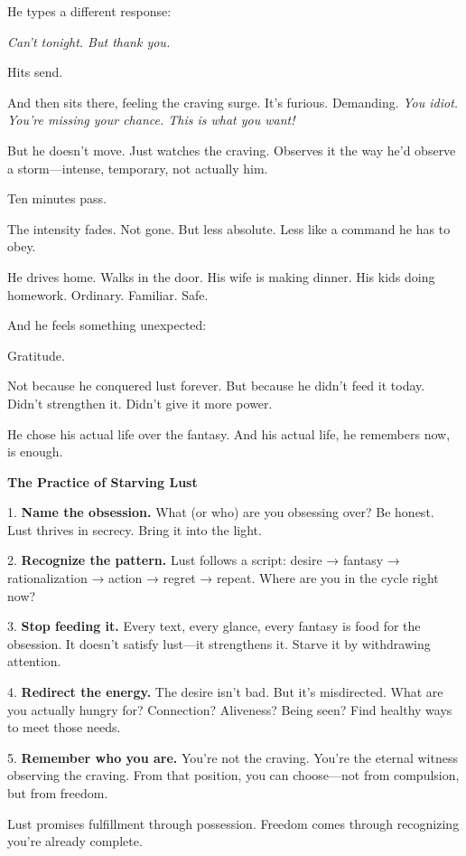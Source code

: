 \documentclass[11pt,twoside]{book}
\begin{document}
He types a different response:

\emph{Can't tonight. But thank you.}

Hits send.

And then sits there, feeling the craving surge. It's furious. Demanding. \emph{You idiot. You're missing your chance. This is what you want!}

But he doesn't move. Just watches the craving. Observes it the way he'd observe a storm—intense, temporary, not actually him.

Ten minutes pass.

The intensity fades. Not gone. But less absolute. Less like a command he has to obey.

He drives home. Walks in the door. His wife is making dinner. His kids doing homework. Ordinary. Familiar. Safe.

And he feels something unexpected:

Gratitude.

Not because he conquered lust forever. But because he didn't feed it today. Didn't strengthen it. Didn't give it more power.

He chose his actual life over the fantasy. And his actual life, he remembers now, is enough.

\begin{practicebox}
\textbf{The Practice of Starving Lust}

1. \textbf{Name the obsession.} What (or who) are you obsessing over? Be honest. Lust thrives in secrecy. Bring it into the light.

2. \textbf{Recognize the pattern.} Lust follows a script: desire → fantasy → rationalization → action → regret → repeat. Where are you in the cycle right now?

3. \textbf{Stop feeding it.} Every text, every glance, every fantasy is food for the obsession. It doesn't satisfy lust—it strengthens it. Starve it by withdrawing attention.

4. \textbf{Redirect the energy.} The desire isn't bad. But it's misdirected. What are you actually hungry for? Connection? Aliveness? Being seen? Find healthy ways to meet those needs.

5. \textbf{Remember who you are.} You're not the craving. You're the eternal witness observing the craving. From that position, you can choose—not from compulsion, but from freedom.

Lust promises fulfillment through possession. Freedom comes through recognizing you're already complete.
\end{practicebox}
\end{document}
